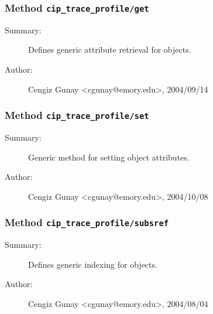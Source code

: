 \subsubsection[Method \texttt{get}]{Method \texttt{cip\_trace\_profile/get}}%
%
\label{ref_cip_trace_profile__get}%
\hypertarget{ref_cip_trace_profile__get}{}%
\begin{description}
\item[Summary:]Defines generic attribute retrieval for objects.
%
%
%
%
%
%
%
\item[Author:]%
Cengiz Gunay <cgunay@emory.edu>, 2004/09/14%
\end{description}
\methodline%
\subsubsection[Method \texttt{set}]{Method \texttt{cip\_trace\_profile/set}}%
%
\label{ref_cip_trace_profile__set}%
\hypertarget{ref_cip_trace_profile__set}{}%
\begin{description}
\item[Summary:]Generic method for setting object attributes.
%
%
%
%
%
%
%
\item[Author:]%
Cengiz Gunay <cgunay@emory.edu>, 2004/10/08%
\end{description}
\methodline%
\subsubsection[Method \texttt{subsref}]{Method \texttt{cip\_trace\_profile/subsref}}%
%
\label{ref_cip_trace_profile__subsref}%
\hypertarget{ref_cip_trace_profile__subsref}{}%
\begin{description}
\item[Summary:]Defines generic indexing for objects.
%
%
%
%
%
%
%
\item[Author:]%
Cengiz Gunay <cgunay@emory.edu>, 2004/08/04%
\end{description}
\methodline%
